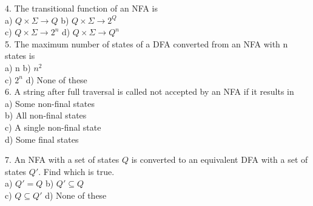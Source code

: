 \documentclass{article}
\begin{document}
\vspace*{0.2cm}
4. The transitional function of an NFA is \\
\hspace*{0.5cm} a) $Q \times \Sigma \rightarrow Q$      \hspace*{0.7cm} b) $Q \times \Sigma \rightarrow 2^Q$ \\
\hspace*{0.5cm} c) $Q \times \Sigma \rightarrow 2^n$    \hspace*{0.7cm} d) $Q \times \Sigma \rightarrow Q^n$ \\


\vspace*{0.2cm}
5. The maximum number of states of a DFA converted from an NFA with n states is \\
\hspace*{0.5cm} a) n          \hspace*{0.7cm}    b) $n^2$ \\
\hspace*{0.5cm} c) $2^n$    \hspace*{0.7cm}    d) None of these \\

\vspace*{0.2cm}
6. A string after full traversal is called not accepted by an NFA if it results in\\
\hspace*{0.5cm} a) Some non-final states\\
\hspace*{0.5cm} b) All non-final states\\
\hspace*{0.5cm} c) A single non-final state \\
\hspace*{0.5cm} d) Some final states \\

\vspace*{0.2cm}

7. An NFA with a set of states $Q$ is converted to an equivalent DFA with a set of states $Q'$. Find which is true.\\
\hspace*{0.5cm} a) $Q' = Q$             \hspace*{0.7cm}     b) $Q' \subseteq Q$ \\
\hspace*{0.5cm} c) $Q \subseteq Q'$        \hspace*{0.7cm}  d) None of these \\
\end{document}
